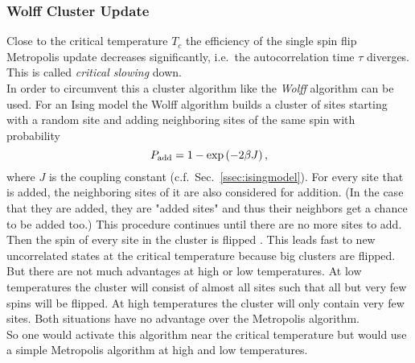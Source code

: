     \subsubsection{Wolff Cluster Update}
    \label{sssec:wolff}
        Close to the critical temperature \(T_c\) the efficiency of the
        single spin flip Metropolis update decreases significantly, i.e.\ the
        autocorrelation time \(\tau\) diverges.
        This is called \emph{critical slowing} down.\\
        In order to circumvent this a cluster algorithm like the \emph{Wolff}
        algorithm \cite{Wolff1989} can be used.
        For an Ising model the Wolff algorithm builds a cluster of sites
        starting with a random site and adding neighboring sites of the
        same spin with probability
        \begin{equation}
            P_{\mathrm{add}} = 1-\exp\left(-2\beta J\right),
            \label{eq:wolffAdd}
        \end{equation}
        where \(J\) is the coupling constant (c.f.\ Sec.\ \ref{ssec:isingmodel}).
        For every site that is added, the neighboring sites of it are
        also considered for addition. (In the case that they are added,
        they are "added sites" and thus their neighbors get a chance to be
        added too.)
        This procedure continues until there are no more sites to add.
        Then the spin of every site in the cluster is flipped
        \cite[p. 91ff]{NewmanBarkema1999} \cite[p. 151f]{Katzgraber2011}.
        This leads fast to new uncorrelated states at the critical
        temperature because big clusters are flipped. But there are not
        much advantages at high or low temperatures. At low temperatures
        the cluster will consist of almost all sites such that all but
        very few spins will be flipped. At high temperatures the cluster
        will only contain very few sites.
        Both situations have no advantage over the Metropolis algorithm.\\
        So one would activate this algorithm near the critical temperature
        but would use a simple Metropolis algorithm at high and low temperatures.

